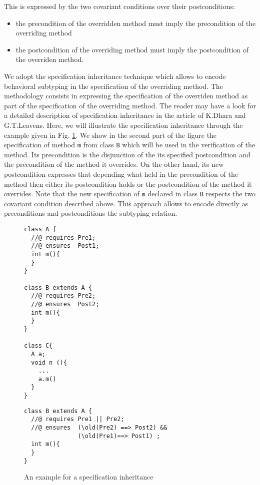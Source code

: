 \begin{description}
        This is expressed by the two covariant conditions over their postconditions:
	\begin{itemize}
	   \item the precondition of the  overridden method must  imply
	         the precondition of the overriding method 
	   \item the postcondition of the overriding method must imply 
	         the postcondition of the overriden method.
	\end{itemize}
	We adopt the specification inheritance technique which allows to encode behavioral subtyping in the specification of the 
	overriding method. The methodology consists in expressing the specification of the overriden method 
	as part of the specification of the overriding method. The reader may have a look for a detailed description of
	specification inheritance  in  the article \cite{Dhara-Leavens95} of K.Dhara and G.T.Leavens. Here, we will 
	illustrate the specification inheritance through the example given in Fig. \ref{assertLang:lang:inherit}. We show in the second part of 
	the figure the specification of method  \lstinline!m!  from class \lstinline!B! which will be used in the verification of the method.
	Its precondition is the disjunction of the its specified postcondition and the precondition of the method it overrides. On the other hand, its new postcondition expresses
	that depending what held in the precondition of the  method then either its postcondition holds or the postcondition of the method it
	overrides. Note that the new specification of \lstinline!m!  declared in class \lstinline!B!  respects the two covariant condition described above.
	This approach allows to encode directly as preconditions and postconditions the subtyping relation. 
	

\begin{figure}[ht!]
\begin{lstlisting}[frame=trbl]
class A {
  //@ requires Pre1;
  //@ ensures  Post1;
  int m(){
  }
}

class B extends A {
  //@ requires Pre2;
  //@ ensures  Post2;
  int m(){
  }
}

class C{
  A a;
  void n (){
    ...
    a.m()
  }
} 
\end{lstlisting}

\begin{lstlisting}[frame=trbl]
class B extends A {
  //@ requires Pre1 || Pre2;
  //@ ensures  (\old(Pre2) ==> Post2) && 
               (\old(Pre1)==> Post1) ;
  int m(){
  }
}

\end{lstlisting}
 
 \caption{\sc An example for a specification inheritance} \label{assertLang:lang:inherit}
\end{figure}

\end{description}




